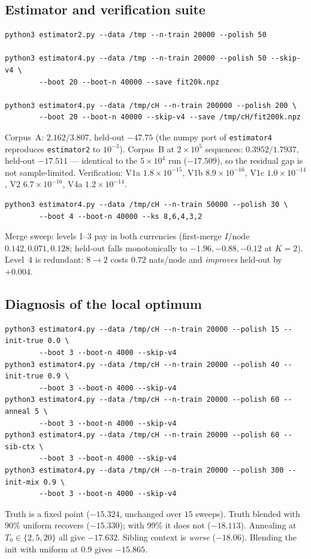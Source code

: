 \subsection*{Estimator and verification suite}

\begin{verbatim}
python3 estimator2.py --data /tmp --n-train 20000 --polish 50

python3 estimator4.py --data /tmp --n-train 20000 --polish 50 --skip-v4 \
        --boot 20 --boot-n 40000 --save fit20k.npz

python3 estimator4.py --data /tmp/cH --n-train 200000 --polish 200 \
        --boot 20 --boot-n 40000 --skip-v4 --save /tmp/cH/fit200k.npz
\end{verbatim}
Corpus~A: $2.162/3.807$, held-out $-47.75$ (the numpy port of
\texttt{estimator4} reproduces \texttt{estimator2} to $10^{-3}$).
Corpus~B at $2\times10^5$ sequences: $0.3952/1.7937$, held-out $-17.511$ ---
identical to the $5\times10^4$ run ($-17.509$), so the residual gap is not
sample-limited. Verification: V1a $1.8\times10^{-15}$, V1b $8.9\times10^{-16}$,
V1c $1.0\times10^{-14}$, V2 $6.7\times10^{-16}$, V4a $1.2\times10^{-14}$.

\begin{verbatim}
python3 estimator4.py --data /tmp/cH --n-train 50000 --polish 30 \
        --boot 4 --boot-n 40000 --ks 8,6,4,3,2
\end{verbatim}
Merge sweep: levels 1--3 pay in both currencies (first-merge $I/\text{node}$
$0.142, 0.071, 0.128$; held-out falls monotonically to $-1.96, -0.88, -0.12$ at
$K=2$). Level~4 is redundant: $8\to2$ costs $0.72$ nats/node and \emph{improves}
held-out by $+0.004$.

\subsection*{Diagnosis of the local optimum}

\begin{verbatim}
python3 estimator4.py --data /tmp/cH --n-train 20000 --polish 15 --init-true 0.0 \
        --boot 3 --boot-n 4000 --skip-v4
python3 estimator4.py --data /tmp/cH --n-train 20000 --polish 40 --init-true 0.9 \
        --boot 3 --boot-n 4000 --skip-v4
python3 estimator4.py --data /tmp/cH --n-train 20000 --polish 60 --anneal 5 \
        --boot 3 --boot-n 4000 --skip-v4
python3 estimator4.py --data /tmp/cH --n-train 20000 --polish 60 --sib-ctx \
        --boot 3 --boot-n 4000 --skip-v4
python3 estimator4.py --data /tmp/cH --n-train 20000 --polish 300 --init-mix 0.9 \
        --boot 3 --boot-n 4000 --skip-v4
\end{verbatim}
Truth is a fixed point ($-15.324$, unchanged over $15$ sweeps). Truth blended
with $90\%$ uniform recovers ($-15.330$); with $99\%$ it does not ($-18.113$).
Annealing at $T_0\in\{2,5,20\}$ all give $-17.632$. Sibling context is
\emph{worse} ($-18.06$). Blending the init with uniform at $0.9$ gives
$-15.865$.

